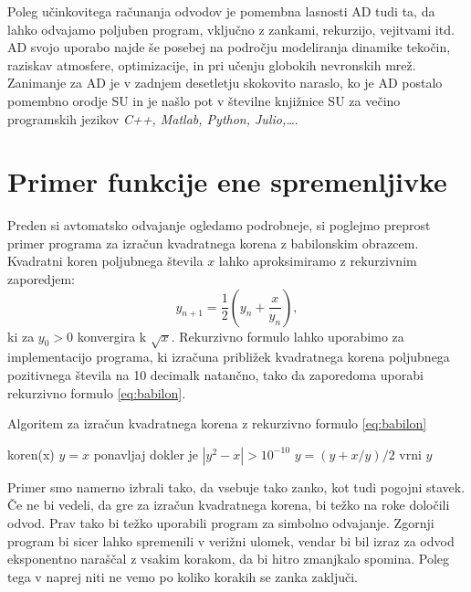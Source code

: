 \documentclass[12pt,slovene]{article}
\begin{document}
Poleg učinkovitega računanja odvodov je pomembna lasnosti AD tudi ta, da lahko odvajamo poljuben program, vključno z zankami, rekurzijo, vejitvami itd. AD svojo uporabo najde še posebej na področju modeliranja dinamike tekočin, raziskav atmosfere, optimizacije, in pri učenju globokih nevronskih mrež. Zanimanje za AD je v zadnjem desetletju skokovito naraslo, ko je AD postalo pomembno orodje SU in je našlo pot v številne knjižnice SU za večino programskih jezikov \textit{C++, Matlab, Python, Julio,\ldots}. 

\section{Primer funkcije ene spremenljivke}

Preden si avtomatsko odvajanje ogledamo podrobneje, si poglejmo preprost primer programa za izračun kvadratnega korena z babilonskim obrazcem. Kvadratni koren poljubnega števila $x$ lahko aproksimiramo z rekurzivnim zaporedjem: 
\begin{equation}\label{eq:babilon}
    y_{n+1} = \frac{1}{2}\left(y_{n} + \frac{x}{y_n}\right),
\end{equation}
ki za $y_0>0$ konvergira k $\sqrt{x}$. Rekurzivno formulo lahko uporabimo za implementacijo programa, ki izračuna približek kvadratnega korena poljubnega pozitivnega števila na 10 decimalk natančno, tako da zaporedoma uporabi rekurzivno formulo \eqref{eq:babilon}.

\begin{algorithm}[H]
\caption{Algoritem za izračun kvadratnega korena z rekurzivno formulo \eqref{eq:babilon} }\label{alg:koren}
\begin{algorithmic}\State
koren(x)
\State\quad $y=x$
\State\quad ponavljaj dokler je $|y^2 - x|>10^{-10}$
\State\quad\quad $y = (y + x/y)/2$
\State vrni $y$
\end{algorithmic}
\end{algorithm}

Primer smo namerno izbrali tako, da vsebuje tako zanko, kot tudi pogojni stavek. Če ne bi vedeli, da gre za izračun kvadratnega korena, bi težko na roke določili odvod. Prav tako bi težko uporabili program za simbolno odvajanje. Zgornji program bi sicer lahko spremenili v verižni ulomek, vendar bi bil izraz za odvod eksponentno naraščal z vsakim korakom, da bi hitro zmanjkalo spomina. Poleg tega v naprej niti ne vemo po koliko korakih se zanka zaključi.
\end{document}
